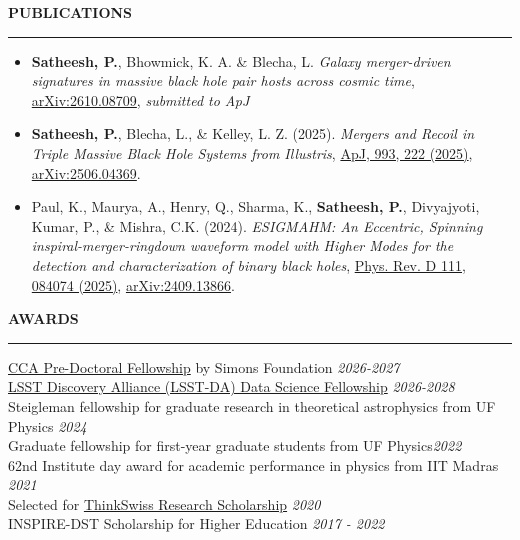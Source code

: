 \documentclass{resume} %
\renewenvironment{rSection}[1]{
\sectionskip
\textbf{\textcolor{C2}{\MakeUppercase{#1}}}
\sectionlineskip
\hrule
\begin{list}{}{
\setlength{\leftmargin}{1.5em}
}
\item[]
}{
\end{list}
}
\begin{document}
\begin{rSection}{Publications}
\begin{itemize}
\item \textbf{Satheesh, P.},  Bhowmick, K. A. \& Blecha, L.
\emph{Galaxy merger-driven signatures in massive black hole pair hosts across cosmic time}, \href{https://arxiv.org/abs/2610.08709}{arXiv:2610.08709}, \emph{submitted to ApJ}
 \item \textbf{Satheesh, P.}, Blecha, L., \& Kelley, L. Z. (2025). \emph{Mergers and Recoil in Triple Massive Black Hole Systems from Illustris}, \href{https://doi.org/10.3847/1538-4357/ae0a48}{ApJ, 993, 222 (2025)}, \href{https://arxiv.org/abs/2506.04369}{arXiv:2506.04369}.
    \item Paul, K., Maurya, A., Henry, Q., Sharma, K., \textbf{Satheesh, P.}, Divyajyoti, Kumar, P., \& Mishra, C.K. (2024). \emph{ESIGMAHM: An Eccentric, Spinning inspiral-merger-ringdown waveform model with Higher Modes for the detection and characterization of binary black holes}, \href{https://journals.aps.org/prd/abstract/10.1103/PhysRevD.111.084074}{Phys. Rev. D 111, 084074 (2025)}, \href{https://arxiv.org/abs/2409.13866}{arXiv:2409.13866}.
\end{itemize}

\begin{rSection}{Awards} \itemsep -2pt 
\href{https://www.simonsfoundation.org/flatiron-institute-center-for-computational-astrophysics-pre-doctoral-program/}{CCA Pre-Doctoral Fellowship} by Simons Foundation \hfill {\em 2026-2027}\\
\href{https://lsstdiscoveryalliance.org/lsst-discovery-alliance-programs/data-science-fellowship/}{LSST Discovery Alliance (LSST-DA) Data Science Fellowship} \hfill {\em 2026-2028}\\
{{\color{C3} Steigleman fellowship} for graduate research in theoretical astrophysics from UF Physics} \hfill {\em 2024}\\
{{\color{C3} Graduate fellowship} for first-year graduate students from UF Physics}\hfill {\em 2022} \\
{{\color{C3} 62nd Institute day} award for academic performance in physics from IIT Madras} \hfill {\em 2021} \\
{Selected for \href{https://swissnex.org/india/thinkswiss/}{ThinkSwiss Research Scholarship}} \hfill {\em 2020}\\
{{\color{C3}INSPIRE-DST Scholarship for Higher Education}} \hfill {\em 2017 - 2022}
\end{rSection}


\end{rSection}
\end{document}
